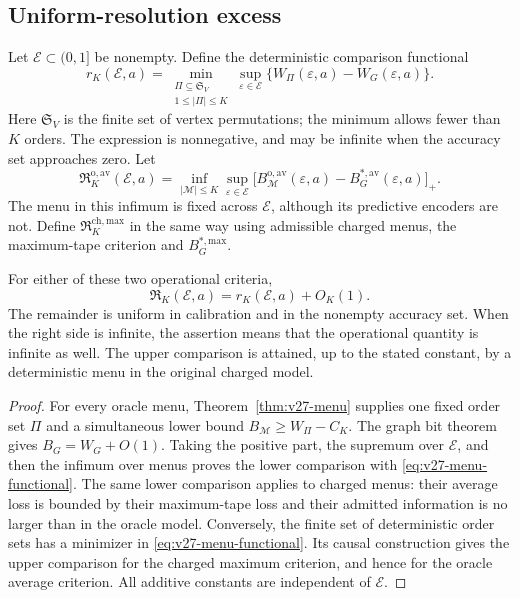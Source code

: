 \subsection{Uniform-resolution excess}
Let $\mathcal E\subset(0,1]$ be nonempty. Define the deterministic comparison functional
\begin{equation}\label{eq:v27-menu-functional}
 r_K(\mathcal E,a)=
 \min_{\substack{\Pi\subseteq\mathfrak S_V\\1\le|\Pi|\le K}}
 \sup_{\varepsilon\in\mathcal E}
       \{W_\Pi(\varepsilon,a)-W_G(\varepsilon,a)\}.
\end{equation}
Here $\mathfrak S_V$ is the finite set of vertex permutations; the minimum allows fewer than $K$ orders. The expression is nonnegative, and may be infinite when the accuracy set approaches zero. Let
\[
 \mathfrak R_K^{\mathrm{o,av}}(\mathcal E,a)
 =\inf_{|\mathcal M|\le K}\sup_{\varepsilon\in\mathcal E}
 \bigl[B^{\mathrm{o,av}}_{\mathcal M}(\varepsilon,a)
                   -B_G^{*,\mathrm{av}}(\varepsilon,a)\bigr]_+.
\]
The menu in this infimum is fixed across $\mathcal E$, although its predictive encoders are not. Define $\mathfrak R_K^{\mathrm{ch,max}}$ in the same way using admissible charged menus, the maximum-tape criterion and $B_G^{*,\mathrm{max}}$.

\begin{corollary}
\label{cor:v27-menu-regret}
For either of these two operational criteria,
\begin{equation}\label{eq:v27-menu-regret}
                  \mathfrak R_K(\mathcal E,a)
                            =r_K(\mathcal E,a)+O_K(1).
\end{equation}
The remainder is uniform in calibration and in the nonempty accuracy set. When the right side is infinite, the assertion means that the operational quantity is infinite as well. The upper comparison is attained, up to the stated constant, by a deterministic menu in the original charged model.
\end{corollary}
\begin{proof}
For every oracle menu, Theorem~\ref{thm:v27-menu} supplies one fixed order set $\Pi$ and a simultaneous lower bound $B_{\mathcal M}\ge W_\Pi-C_K$. The graph bit theorem gives $B_G=W_G+O(1)$. Taking the positive part, the supremum over $\mathcal E$, and then the infimum over menus proves the lower comparison with \eqref{eq:v27-menu-functional}. The same lower comparison applies to charged menus: their average loss is bounded by their maximum-tape loss and their admitted information is no larger than in the oracle model. Conversely, the finite set of deterministic order sets has a minimizer in \eqref{eq:v27-menu-functional}. Its causal construction gives the upper comparison for the charged maximum criterion, and hence for the oracle average criterion. All additive constants are independent of $\mathcal E$.
\end{proof}

